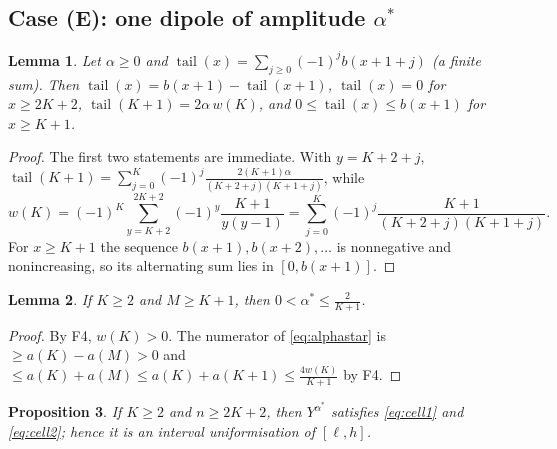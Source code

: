 \documentclass[11pt]{amsart}
\newtheorem{lemma}{Lemma}[section]
\newtheorem{proposition}[lemma]{Proposition}
\theoremstyle{definition}
\theoremstyle{remark}
\numberwithin{equation}{section}
\newcommand{\tail}{\operatorname{tail}}
\begin{document}
\subsection{Case (E): one dipole of amplitude \texorpdfstring{$\alpha^*$}{alpha*}}

\begin{lemma}\label{lem:tail}
Let $\alpha\ge0$ and $\tail(x)=\sum_{j\ge0}(-1)^jb(x+1+j)$ (a finite sum). Then
$\tail(x)=b(x+1)-\tail(x+1)$, $\tail(x)=0$ for $x\ge2K+2$, $\tail(K+1)=2\alpha\,w(K)$, and
$0\le\tail(x)\le b(x+1)$ for $x\ge K+1$.
\end{lemma}

\begin{proof}
The first two statements are immediate. With $y=K+2+j$,
$\tail(K+1)=\sum_{j=0}^{K}(-1)^j\frac{2(K+1)\alpha}{(K+2+j)(K+1+j)}$, while
\[
w(K)=(-1)^K\sum_{y=K+2}^{2K+2}(-1)^y\frac{K+1}{y(y-1)}=\sum_{j=0}^{K}(-1)^j\frac{K+1}{(K+2+j)(K+1+j)}.
\]
For $x\ge K+1$ the sequence $b(x+1),b(x+2),\dots$ is nonnegative and nonincreasing, so its alternating
sum lies in $[0,b(x+1)]$.
\end{proof}

\begin{lemma}\label{lem:alphastar}
If $K\ge2$ and $M\ge K+1$, then $0<\alpha^*\le\frac2{K+1}$.
\end{lemma}

\begin{proof}
By F4, $w(K)>0$. The numerator of \eqref{eq:alphastar} is $\ge a(K)-a(M)>0$ and
$\le a(K)+a(M)\le a(K)+a(K+1)\le\frac{4w(K)}{K+1}$ by F4.
\end{proof}

\begin{proposition}\label{prop:caseE}
If $K\ge2$ and $n\ge2K+2$, then $Y^{\alpha^*}$ satisfies \eqref{eq:cell1} and \eqref{eq:cell2}; hence it
is an interval uniformisation of $[\ell,h]$.
\end{proposition}
\end{document}
